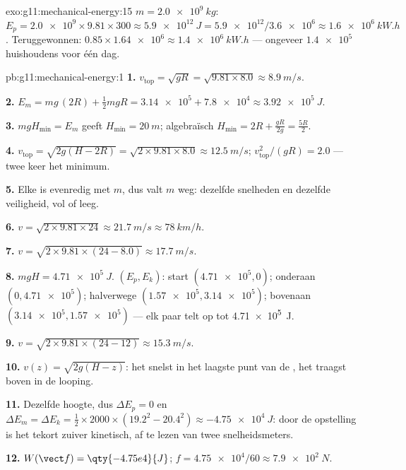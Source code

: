 \begin{solution}{exo:g11:mechanical-energy:15}
$m = \qty{2.0e9}{kg}$:
$E_p = \num{2.0e9} \times 9.81 \times 300 \approx \qty{5.9e12}{J}
= \num{5.9e12}/\num{3.6e6} \approx \qty{1.6e6}{kW.h}$. Teruggewonnen:
$0.85 \times \num{1.64e6} \approx \qty{1.4e6}{kW.h}$ --- ongeveer
$\num{1.4e5}$ huishoudens voor één dag.
\end{solution}

\begin{solution}{pb:g11:mechanical-energy:1}
\textbf{1.} $v_{\text{top}} = \sqrt{gR} = \sqrt{9.81 \times 8.0}
\approx \qty{8.9}{m/s}$.

\textbf{2.} $E_m = mg\,(2R) + \tfrac12 m gR = \num{3.14e5} +
\num{7.8e4} \approx \qty{3.92e5}{J}$.

\textbf{3.} $mgH_{\min} = E_m$ geeft $H_{\min} = \qty{20}{m}$;
algebraïsch $H_{\min} = 2R + \frac{gR}{2g} = \frac{5R}{2}$.

\textbf{4.} $v_{\text{top}} = \sqrt{2g(H - 2R)} =
\sqrt{2 \times 9.81 \times 8.0} \approx \qty{12.5}{m/s}$;
$v_{\text{top}}^2/(gR) = 2.0$ --- twee keer het minimum.

\textbf{5.} Elke  is evenredig met $m$, dus valt $m$ weg:
dezelfde snelheden en dezelfde veiligheid, vol of leeg.

\textbf{6.} $v = \sqrt{2 \times 9.81 \times 24} \approx \qty{21.7}{m/s}
\approx \qty{78}{km/h}$.

\textbf{7.} $v = \sqrt{2 \times 9.81 \times (24 - 8.0)} \approx
\qty{17.7}{m/s}$.

\textbf{8.} $mgH = \qty{4.71e5}{J}$. $(E_p, E_k)$: start
$(\num{4.71e5}, 0)$; onderaan $(0, \num{4.71e5})$; halverwege
$(\num{1.57e5}, \num{3.14e5})$; bovenaan
$(\num{3.14e5}, \num{1.57e5})$ --- elk paar telt op tot
\qty{4.71e5}{J}.

\textbf{9.} $v = \sqrt{2 \times 9.81 \times (24 - 12)} \approx
\qty{15.3}{m/s}$.

\textbf{10.} $v(z) = \sqrt{2g(H - z)}$: het snelst in het laagste punt
van de , het traagst boven in de looping.

\textbf{11.} Dezelfde hoogte, dus $\Delta E_p = 0$ en
$\Delta E_m = \Delta E_k = \tfrac12 \times 2000 \times (19.2^2 -
20.4^2) \approx \qty{-4.75e4}{J}$: door de opstelling is het tekort
zuiver kinetisch, af te lezen van twee snelheidsmeters.

\textbf{12.} $W(\vect f) = \qty{-4.75e4}{J}$;
$f = \num{4.75e4}/60 \approx \qty{7.9e2}{N}$.


\end{solution}
